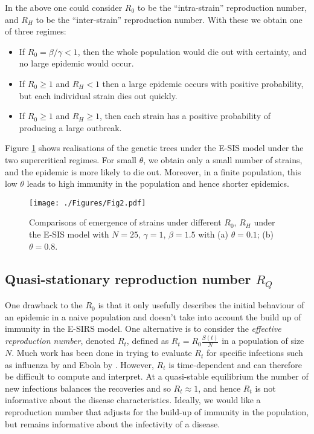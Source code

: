 \documentclass[review]{elsarticle}
\begin{document}
In the above one could consider $R_0$ to be the ``intra-strain'' reproduction number, and $R_H$ to be the ``inter-strain'' reproduction number. With these we obtain one of three regimes:
\begin{itemize}
	\item If $R_0 = \beta/\gamma < 1$, then the whole population would die out with certainty, and no large epidemic would occur.
	\item If $R_0 \geq 1$ and $R_H < 1$ then a large epidemic occurs with positive probability, but each individual strain dies out quickly.
	\item If $R_0 \geq 1$ and $R_H \geq 1$, then each strain has a positive probability of producing a large outbreak.
\end{itemize}
Figure \ref{fig: tree} shows realisations of the genetic trees under the E-SIS model under the two supercritical regimes. For small $\theta$, we obtain only a small number of strains, and the epidemic is more likely to die out. Moreover, in a finite population, this low $\theta$ leads to high immunity in the population and hence shorter epidemics. 

\begin{figure}[h!]
	\centering
 		\texttt{[image: ./Figures/Fig2.pdf]}
	\caption{Comparisons of emergence of strains under different $R_0$, $R_H$ under the E-SIS model with $N=25$, $\gamma = 1$, $\beta = 1.5$ with (a) $\theta=0.1$; (b) $\theta=0.8$.}
	\label{fig: tree}
\end{figure}

\subsection{Quasi-stationary reproduction number $R_Q$}\label{subsec: rt}
One drawback to the $R_0$ is that it only usefully describes the initial behaviour of an epidemic in a naive population and doesn't take into account the build up of immunity in the E-SIRS model. One alternative is to consider the \emph{effective reproduction number}, denoted $R_t$, defined as $R_t = R_0 \frac{S(t)}{N}$ in a population of size $N$. Much work has been done in trying to evaluate $R_t$ for specific infections such as influenza by \cite{cowling2010} and Ebola by \cite{althaus2014}. However, $R_t$ is time-dependent and can therefore be difficult to compute and interpret. At a quasi-stable equilibrium the number of new infections balances the recoveries and so $R_t\approx 1$, and hence $R_t$ is not informative about the disease characteristics. Ideally, we would like a reproduction number that adjusts for the build-up of immunity in the population, but remains informative about the infectivity of a disease. 
\end{document}
